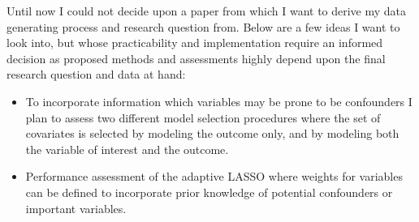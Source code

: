 \documentclass[11pt, a4paper, leqno]{article}
\numberwithin{equation}{section}
\numberwithin{figure}{section}
\numberwithin{table}{section}
\begin{document}
Until now I could not decide upon a paper from which I want to derive my data generating process and research question from. Below are a few ideas I want to look into, but whose practicability and implementation require an informed decision as proposed methods and assessments highly depend upon the final research question and data at hand:

\begin{itemize}
	\item To incorporate information which variables may be prone to be confounders I plan to assess two different model selection procedures where the set of covariates is selected by modeling the outcome only, and by modeling both the variable of interest and the outcome.
	\item Performance assessment of the adaptive LASSO where weights for variables can be defined to incorporate prior knowledge of potential confounders or important variables.
\end{itemize}
\end{document}
